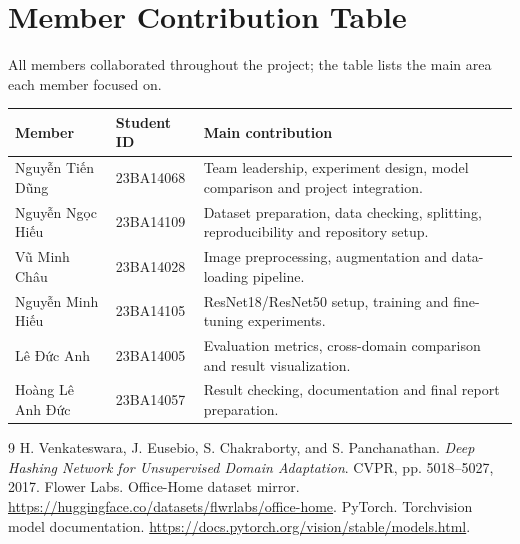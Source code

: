 \documentclass{article}
\begin{document}
\section{Member Contribution Table}
All members collaborated throughout the project; the table lists the main area each member focused on.

\begin{center}
\small
\begin{tabular}{p{}p{}p{}}
\hline
Member & Student ID & Main contribution \\
\hline
Nguyễn Tiến Dũng & 23BA14068 & Team leadership, experiment design, model comparison and project integration. \\
Nguyễn Ngọc Hiếu & 23BA14109 & Dataset preparation, data checking, splitting, reproducibility and repository setup. \\
Vũ Minh Châu & 23BA14028 & Image preprocessing, augmentation and data-loading pipeline. \\
Nguyễn Minh Hiếu & 23BA14105 & ResNet18/ResNet50 setup, training and fine-tuning experiments. \\
Lê Đức Anh & 23BA14005 & Evaluation metrics, cross-domain comparison and result visualization. \\
Hoàng Lê Anh Đức & 23BA14057 & Result checking, documentation and final report preparation. \\
\hline
\end{tabular}
\end{center}

\begin{thebibliography}{9}
 H. Venkateswara, J. Eusebio, S. Chakraborty, and S. Panchanathan. \emph{Deep Hashing Network for Unsupervised Domain Adaptation}. CVPR, pp. 5018--5027, 2017.
 Flower Labs. Office-Home dataset mirror. \url{https://huggingface.co/datasets/flwrlabs/office-home}.
 PyTorch. Torchvision model documentation. \url{https://docs.pytorch.org/vision/stable/models.html}.
\end{thebibliography}
\end{document}
